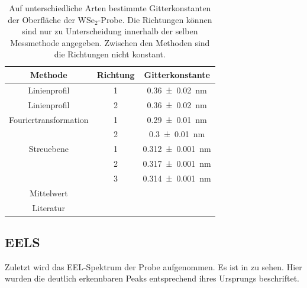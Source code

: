 	\begin{table}
		\centering
		\caption{Auf unterschiedliche Arten bestimmte Gitterkonstanten der Oberfläche der WSe$_2$-Probe. Die Richtungen können sind nur zu Unterscheidung innerhalb der selben Messmethode angegeben. Zwischen den Methoden sind die Richtungen nicht konstant.}
		\begin{tabular}{c| c | c}
			Methode & Richtung & Gitterkonstante \\ \hline
      Linienprofil &  1 & \SI{0.36 \pm 0.02}{nm}\\ %
      Linienprofil &  2 & \SI{0.36 \pm 0.02}{nm}\\ %
      Fouriertransformation & 1 & \SI{0.29 \pm 0.01}{nm}\\
      & 2 & \SI{0.3 \pm 0.01}{nm}\\
      Streuebene & 1 & \SI{0,312 \pm 0.001}{nm} \\
      & 2 & \SI{0,317 \pm 0.001}{nm} \\
      & 3 & \SI{0,314 \pm 0.001}{nm} \\
      Mittelwert & & \\ %
      Literatur & & \\ %
		\end{tabular}
		\label{tab:netz}
	\end{table}

  \subsection{EELS}

  Zuletzt wird das EEL-Spektrum der Probe aufgenommen.
  Es ist in zu sehen. %
  Hier wurden die deutlich erkennbaren Peaks entsprechend ihres Ursprungs beschriftet.
